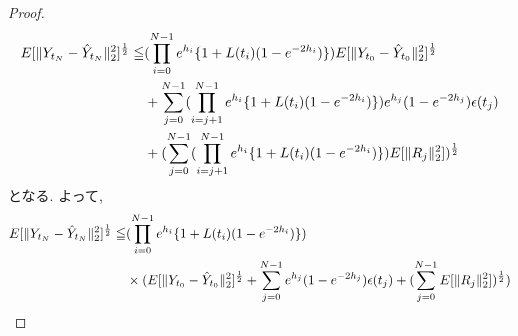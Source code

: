 \documentclass[11pt,a4paper]{ltjsarticle}
\theoremstyle{remark}
\begin{document}
\begin{proof}
    \begin{align}
        E[\|Y_{t_{N}}-\hat{Y}_{t_{N}}\|^2_2]^\frac{1}{2}\leqq& (\prod_{i=0}^{N-1}e^{h_i}\{1+L(t_i)(1-e^{-2h_i})\})
        E[\|
            Y_{t_0}-\hat{Y}_{t_0}
        \|^2_2]^{\frac{1}{2}}\notag\\
        &+\sum_{j=0}^{N-1}(\prod_{i=j+1}^{N-1}
        e^{h_i}\{1+L(t_i)(1-e^{-2h_i})\})e^{h_j}(1-e^{-2h_j})
        \epsilon(t_j)\notag\\
        &+(\sum_{j=0}^{N-1}(\prod_{i=j+1}^{N-1}
        e^{h_i}\{1+L(t_i)(1-e^{-2h_i})\})E[\|R_j\|^2_2])^\frac{1}{2}
    \end{align}
    となる. よって, 
    \begin{align}
        E[\|Y_{t_{N}}-\hat{Y}_{t_{N}}\|^2_2]^\frac{1}{2}\leqq& (\prod_{i=0}^{N-1}e^{h_i}\{1+L(t_i)(1-e^{-2h_i})\})\notag\\
        &\times(E[\|
            Y_{t_0}-\hat{Y}_{t_0}
        \|^2_2]^{\frac{1}{2}}+\sum_{j=0}^{N-1}e^{h_j}(1-e^{-2h_j})
        \epsilon(t_j)+(\sum_{j=0}^{N-1}E[\|R_j\|^2_2])^\frac{1}{2})
    \end{align}


\end{proof}
\end{document}
